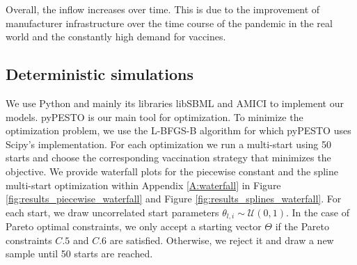 Overall, the inflow increases over time. This is due to the improvement of manufacturer infrastructure over the time course of the pandemic in the real world and the constantly high demand for vaccines.


\subsection{Deterministic simulations}
We use Python and mainly its libraries libSBML \citep{Bornstein.2008} and AMICI \citep{Frohlich.2021} to implement our models. pyPESTO \citep{pyPESTO} is our main tool for optimization. To minimize the optimization problem, we use the L-BFGS-B algorithm \citep{Zhu.1997} for which pyPESTO uses Scipy's \citep{scipy.2020} implementation. For each optimization we run a multi-start using 50 starts and choose the corresponding vaccination strategy that minimizes the objective. We provide waterfall plots for the piecewise constant and the spline multi-start optimization within Appendix \ref{A:waterfall} in Figure \ref{fig:results_piecewise_waterfall} and Figure \ref{fig:results_splines_waterfall}. For each start, we draw uncorrelated start parameters $\theta_{l,i} \sim \mathcal{U}(0,1)$. In the case of Pareto optimal constraints, we only accept a starting vector $\Theta$ if the Pareto constraints $C.5$ and $C.6$ are satisfied. Otherwise, we reject it and draw a new sample until 50 starts are reached.\\


